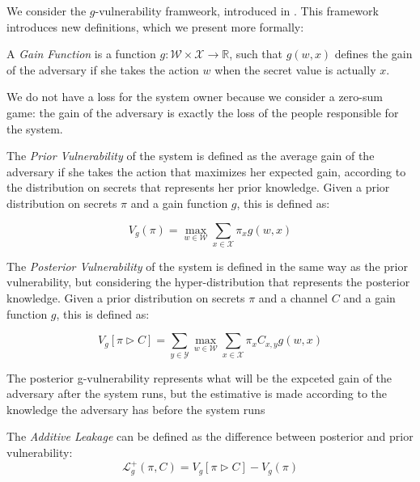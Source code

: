 We consider the $g$-vulnerability framweork, introduced in \cite{QIF}. This framework introduces new definitions, which we present more formally:

\begin{definition}
A \emph{Gain Function} is a function $g : \mathcal{W} \times \mathcal{X} \rightarrow \mathbb{R}$, such that $g(w,x)$ defines the gain of the adversary if she takes the action $w$ when the secret value is actually $x$. 
\end{definition}

We do not have a loss for the system owner because we consider a zero-sum game: the gain of the adversary is exactly the loss of the people responsible for the system. 

\begin{definition}
The \emph{Prior Vulnerability} of the system is defined as the average gain of the adversary if she takes the action that maximizes her expected gain, according to the distribution on secrets that represents her prior knowledge. Given a prior distribution on secrets $\pi$ and a gain function $g$, this is defined as:

$$V_g(\pi) = \max\limits_{w\in \mathcal{W}}\sum\limits_{x\in\mathcal{X}} \pi_x g(w,x)$$
\end{definition}

\begin{definition}
The \emph{Posterior Vulnerability} of the system is defined in the same way as the prior vulnerability, but considering the hyper-distribution that represents the posterior knowledge. Given a prior distribution on secrets $\pi$ and a channel $C$ and a gain function $g$, this is defined as:

$$V_g[\pi\triangleright C] = \sum\limits_{y \in \mathcal{Y}}\max\limits_{w\in \mathcal{W}}\sum\limits_{x\in\mathcal{X}} \pi_xC_{x,y} g(w,x)$$
\end{definition}

The posterior g-vulnerability represents what will be the expceted gain of the adversary after the system runs, but the estimative is made according to the knowledge the adversary has before the system runs

\begin{definition}
The \emph{Additive Leakage} can be defined as the difference between posterior and prior vulnerability:
$$\mathcal{L}_g^+(\pi,C) = V_g[\pi\triangleright C]-V_g(\pi)$$
\end{definition}

